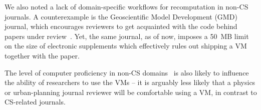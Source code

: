 We also noted a lack of domain-specific workflows for recomputation in non-CS journals.
A counterexample is the Geoscientific Model Development (GMD) journal, which encourages reviewers to get
  acquainted with the code behind papers under review~\cite{GMD_editorial_2013}.
Yet, the same journal, as of now, imposes a 50~MB limit on the size of electronic supplements 
  which effectively rules out shipping a VM together with the paper.

The level of computer proficiency in non-CS domains~\cite{Merali_2010}
is also likely to influence the ability of researchers to use the VMs -- it is arguably less likely that a physics or urban-planning journal reviewer will be comfortable using a VM, in contrast to CS-related journals.
